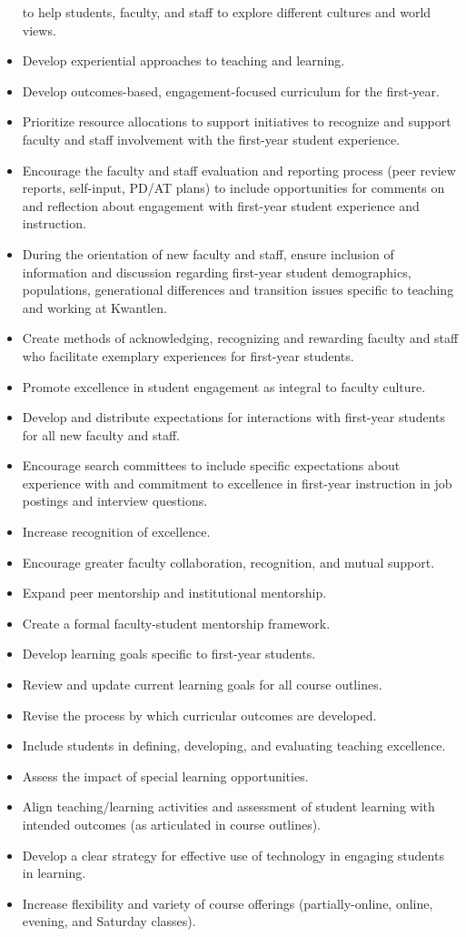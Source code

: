 \documentclass[10pt, letterpaper]{article}
\begin{document}
\begin{itemize}
  to help students, faculty, and staff to explore different cultures and
  world views.
\item
  Develop experiential approaches to teaching and learning.
\item
  Develop outcomes-based, engagement-focused curriculum for the
  first-year.
\item
  Prioritize resource allocations to support initiatives to recognize
  and support faculty and staff involvement with the first-year student
  experience.
\item
  Encourage the faculty and staff evaluation and reporting process (peer
  review reports, self-input, PD/AT plans) to include opportunities for
  comments on and reflection about engagement with first-year student
  experience and instruction.
\item
  During the orientation of new faculty and staff, ensure inclusion of
  information and discussion regarding first-year student demographics,
  populations, generational differences and transition issues specific
  to teaching and working at Kwantlen.
\item
  Create methods of acknowledging, recognizing and rewarding faculty and
  staff who facilitate exemplary experiences for first-year students.
\item
  Promote excellence in student engagement as integral to faculty
  culture.
\item
  Develop and distribute expectations for interactions with first-year
  students for all new faculty and staff.
\item
  Encourage search committees to include specific expectations about
  experience with and commitment to excellence in first-year instruction
  in job postings and interview questions.
\item
  Increase recognition of excellence.
\item
  Encourage greater faculty collaboration, recognition, and mutual
  support.
\item
  Expand peer mentorship and institutional mentorship.
\item
  Create a formal faculty-student mentorship framework.
\item
  Develop learning goals specific to first-year students.
\item
  Review and update current learning goals for all course outlines.
\item
  Revise the process by which curricular outcomes are developed.
\item
  Include students in defining, developing, and evaluating teaching
  excellence.
\item
  Assess the impact of special learning opportunities.
\item
  Align teaching/learning activities and assessment of student learning
  with intended outcomes (as articulated in course outlines).
\item
  Develop a clear strategy for effective use of technology in engaging
  students in learning.
\item
  Increase flexibility and variety of course offerings
  (partially-online, online, evening, and Saturday classes).
\end{itemize}
\end{document}
